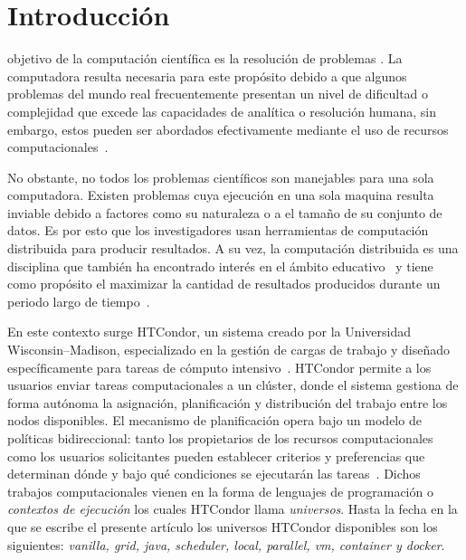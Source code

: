 \section{Introducción}
 objetivo de la computación científica es la resolución
de problemas \cite{landau01}. La computadora resulta necesaria para este propósito debido a
que algunos problemas del mundo real frecuentemente presentan un nivel de dificultad
o complejidad que excede las capacidades de analítica o resolución humana, sin embargo,
estos pueden ser abordados efectivamente mediante el uso
de recursos computacionales~\cite{landau01}.


No obstante, no todos los problemas científicos son
manejables para una sola computadora. Existen problemas cuya ejecución en una sola maquina resulta
inviable debido a factores como su naturaleza o a el tamaño de su conjunto de datos. Es por esto
que los investigadores usan herramientas de computación distribuida para producir resultados. A su vez, la computación distribuida es una disciplina que también
ha encontrado interés en el ámbito educativo~\cite{Senol-01} y tiene como
propósito el maximizar la cantidad de resultados producidos durante un periodo
largo de tiempo~\cite{juve-01}.

En este contexto surge HTCondor, un sistema creado por la
Universidad Wisconsin–Madison, especializado en la gestión de cargas
de trabajo y diseñado específicamente para tareas de cómputo intensivo~\cite{chang-01, htcondor-description}.
HTCondor permite a los usuarios enviar tareas computacionales a un clúster,
donde el sistema gestiona de forma autónoma la asignación, planificación y distribución del
trabajo entre los nodos disponibles. El mecanismo de planificación opera bajo un
modelo de políticas bidireccional: tanto los propietarios de los recursos computacionales
como los usuarios solicitantes pueden establecer criterios y preferencias
que determinan dónde y bajo qué condiciones se ejecutarán las tareas~\cite{htcondor-description}.
Dichos trabajos computacionales vienen en la forma de lenguajes de programación
o \textit{contextos de ejecución} los cuales HTCondor llama
\textit{universos}. Hasta la fecha en la que se escribe el presente artículo
los universos HTCondor disponibles son los siguientes: \textit{vanilla, grid, java, scheduler,
	local, parallel, vm, container y docker}.



